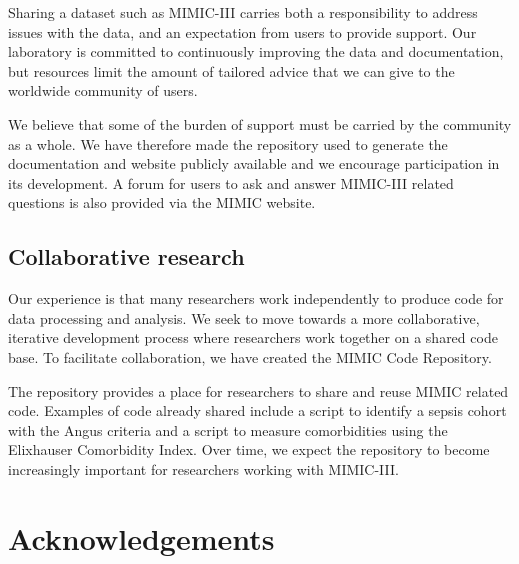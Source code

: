 \documentclass[english]{article}
\begin{document}
Sharing a dataset such as MIMIC-III carries both a responsibility to address issues with the data, and an expectation from users to provide support. Our laboratory is committed to continuously improving the data and documentation, but resources limit the amount of tailored advice that we can give to the worldwide community of users.

We believe that some of the burden of support must be carried by the community as a whole. We have therefore made the repository used to generate the documentation and website publicly available and we encourage participation in its development. A forum for users to ask and answer MIMIC-III related questions is also provided via the MIMIC website.


\subsection*{Collaborative research}

Our experience is that many researchers work independently to produce code for data processing and analysis. We seek to move towards a more collaborative, iterative development process where researchers work together on a shared code base. To facilitate collaboration, we have created the MIMIC Code Repository.

The repository provides a place for researchers to share and reuse MIMIC related code. Examples of code already shared include a script to identify a sepsis cohort with the Angus criteria and a script to measure comorbidities using the Elixhauser Comorbidity Index. Over time, we expect the repository to become increasingly important for researchers working with MIMIC-III.


\section*{Acknowledgements}

\end{document}
